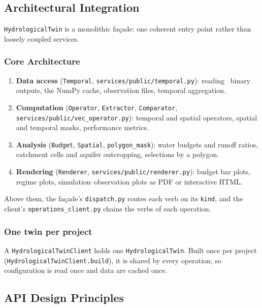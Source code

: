 \subsection{Architectural Integration}

\texttt{HydrologicalTwin} is a monolithic façade: one coherent entry point
rather than loosely coupled services.

\subsubsection{Core Architecture}

\begin{enumerate}
    \item \textbf{Data access} (\texttt{Temporal}, \texttt{services/public/temporal.py}): reading \cw\ binary outputs, the NumPy cache, observation files, temporal aggregation.
    \item \textbf{Computation} (\texttt{Operator}, \texttt{Extractor}, \texttt{Comparator}, \texttt{services/public/vec\_operator.py}): temporal and spatial operators, spatial and temporal masks, performance metrics.
    \item \textbf{Analysis} (\texttt{Budget}, \texttt{Spatial}, \texttt{polygon\_mask}): water budgets and runoff ratios, catchment cells and aquifer outcropping, selections by a polygon.
    \item \textbf{Rendering} (\texttt{Renderer}, \texttt{services/public/renderer.py}): budget bar plots, regime plots, simulation--observation plots as PDF or interactive HTML.
\end{enumerate}

Above them, the façade's \texttt{dispatch.py} routes each verb on its
\texttt{kind}, and the client's \texttt{operations\_client.py} chains the verbs
of each operation.

\subsubsection{One twin per project}

A \texttt{HydrologicalTwinClient} holds one \texttt{HydrologicalTwin}. Built
once per project (\texttt{HydrologicalTwinClient.build}), it is shared by every
operation, so configuration is read once and data are cached once.

\subsection{API Design Principles}

